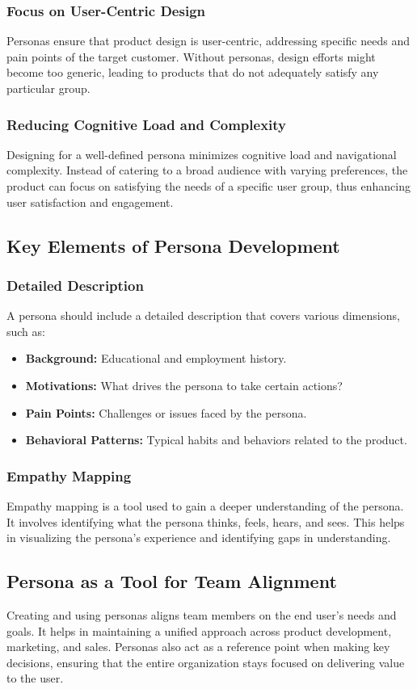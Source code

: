 \documentclass[a4paper,11pt]{article}
\begin{document}
\subsubsection{Focus on User-Centric Design}
Personas ensure that product design is user-centric, addressing specific needs and pain points of the target customer. Without personas, design efforts might become too generic, leading to products that do not adequately satisfy any particular group.

\subsubsection{Reducing Cognitive Load and Complexity}
Designing for a well-defined persona minimizes cognitive load and navigational complexity. Instead of catering to a broad audience with varying preferences, the product can focus on satisfying the needs of a specific user group, thus enhancing user satisfaction and engagement.

\subsection{Key Elements of Persona Development}
\subsubsection{Detailed Description}
A persona should include a detailed description that covers various dimensions, such as:

\begin{itemize}
    \item \textbf{Background:} Educational and employment history.
    \item \textbf{Motivations:} What drives the persona to take certain actions?
    \item \textbf{Pain Points:} Challenges or issues faced by the persona.
    \item \textbf{Behavioral Patterns:} Typical habits and behaviors related to the product.
\end{itemize}

\subsubsection{Empathy Mapping}
Empathy mapping is a tool used to gain a deeper understanding of the persona. It involves identifying what the persona thinks, feels, hears, and sees. This helps in visualizing the persona's experience and identifying gaps in understanding.

\subsection{Persona as a Tool for Team Alignment}
Creating and using personas aligns team members on the end user’s needs and goals. It helps in maintaining a unified approach across product development, marketing, and sales. Personas also act as a reference point when making key decisions, ensuring that the entire organization stays focused on delivering value to the user.
\end{document}
